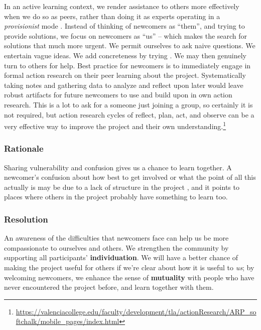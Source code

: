 In an active learning context, we render assistance to others more effectively when we do
so as peers, rather than doing it as experts operating in a \emph{provisionist} mode
\cite{boud2005peer}.  Instead of thinking of newcomers as
``them'', and trying to provide solutions, we focus on newcomers as
``us'' -- which makes the search for solutions that much more urgent.
We permit ourselves to ask naive questions.  We entertain vague ideas.
We add concreteness by trying .  We may then genuinely turn
to others for help. 
Best practice for newcomers is to immediately engage in formal action research on their peer learning about the project. Systematically taking notes and gathering data to analyze and reflect upon later would leave robust artifacts for future newcomers to use and build upon in own action research. This is a lot to ask for a someone just joining a group, so certainly it is not required, but action research cycles of reflect, plan, act, and observe can be a very effective way to improve the project and their own understanding.\footnote{\url{https://valenciacollege.edu/faculty/development/tla/actionResearch/ARP_softchalk/mobile_pages/index.html}}

%
\subsubsection*{Rationale} 
%
Sharing vulnerability and confusion gives us a chance to learn
together.  A newcomer's confusion about how best to get involved or
what the point of all this actually is may be due to a lack of
structure in the project , and it points to
places where others in the project probably have something to learn too.
%

\subsubsection*{Resolution}
An awareness of the difficulties that newcomers face can
help us be more compassionate to ourselves and others.  We strengthen the community
by supporting all participants' \textbf{individuation}.  We will have a better chance of making
the project useful for others if we're clear about how it is useful to \emph{us}; by welcoming newcomers, we enhance the sense of \textbf{mutuality} with people who have never encountered the project before, and learn together with them.


